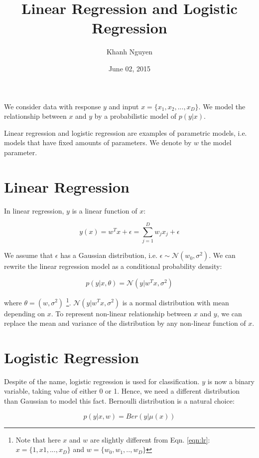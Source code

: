 \documentclass[11pt,letterpaper]{article}
\title{
    Linear Regression and Logistic Regression  
}
\author{
	Khanh Nguyen
}
\date{June 02, 2015}
\theoremstyle{definition}
\begin{document}
\maketitle

We consider data with response $y$ and input $x = \{x_1, x_2, ..., x_D\}$. We model the relationship between $x$ and $y$ by a probabilistic model of $p(y | x)$.

Linear regression and logistic regression are examples of parametric models, i.e. models that have fixed amounts of parameters. We denote by $w$ the model parameter.

\section{Linear Regression}

  In linear regression, $y$ is a linear function of $x$:

\begin{equation}
y(x) = w^{T}x + \epsilon = \sum_{j=1}^D w_jx_j + \epsilon
\end{equation}
\label{eqn:lr}

We assume that $\epsilon$ has a Gaussian distribution, i.e. $\epsilon \sim \mathcal{N}(w_0, \sigma^2)$. We can rewrite the linear regression model as a conditional probability density:

\begin{equation}
p(y | x, \theta) = \mathcal{N}(y | w^{T}x, \sigma^2)
\end{equation}

where $\theta = (w, \sigma^2)$ \footnote{Note that here $x$ and $w$ are slightly different from Eqn. \ref{eqn:lr}: $x = \{1, x1, ..., x_D\}$ and $w = \{w_0, w_1, .., w_D\}$}. $\mathcal{N}(y | w^{T}x, \sigma^2)$ is a normal distribution with mean depending on $x$. To represent non-linear relationship between $x$ and $y$, we can replace the mean and variance of the distribution by any non-linear function of $x$.

\section{Logistic Regression}

Despite of the name, logistic regression is used for classification. $y$ is now a binary variable, taking value of either 0 or 1. Hence, we need a different distribution than Gaussian to model this fact. Bernoulli distribution is a natural choice:

\begin{equation}
p(y | x, w) = Ber(y | \mu(x))
\end{equation}
\end{document}
